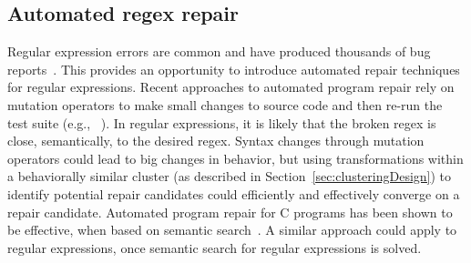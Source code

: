 \subsection{Automated regex repair}  Regular expression errors are common and have produced thousands of bug reports~. This provides an opportunity to introduce automated repair techniques for regular expressions.
Recent approaches to automated program repair rely on mutation operators to make small changes to source code and then re-run the test suite (e.g., ~). In regular expressions, it is likely that the broken regex is close, semantically, to the desired regex. Syntax changes through mutation operators could lead to big changes in behavior, but using transformations within a behaviorally similar cluster (as described in Section~\ref{sec:clusteringDesign}) to identify potential repair candidates could efficiently and effectively converge on a repair candidate.  Automated program repair for C programs has been shown to be effective, when based on semantic search~.  A similar approach could apply to regular expressions, once semantic search for regular expressions is solved.


